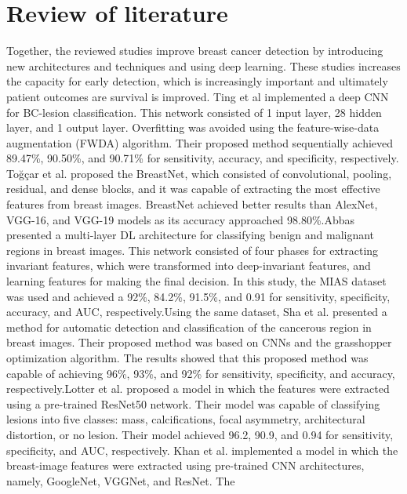 \documentclass[12]{article}
\begin{document}
\section{Review of literature}
Together, the reviewed studies improve breast cancer detection by introducing new architectures and techniques and using deep learning. These studies increases the capacity for early detection, which is increasingly important and ultimately patient outcomes are survival is improved.
\newline
Ting et al\cite{ting2019convolutional} implemented a deep CNN for BC-lesion classification. This network consisted of 1 input layer, 28 hidden layer, and 1 output layer. Overfitting was avoided using the feature-wise-data augmentation (FWDA) algorithm. Their proposed method sequentially achieved 89.47\%, 90.50\%,
and 90.71\% for sensitivity, accuracy, and specificity, respectively. Toğçar et al.\cite{tougaccar2020breastnet}  proposed the BreastNet, which consisted of convolutional, pooling, residual, and dense blocks,
and it was capable of extracting the most effective features
from breast images. BreastNet achieved better results than
AlexNet, VGG-16, and VGG-19 models as its accuracy
approached 98.80\%.Abbas \cite{abbas2016deepcad} presented a multi-layer DL architecture for classifying benign and malignant regions in
breast images. This network consisted of four phases for
extracting invariant features, which were transformed into
deep-invariant features, and learning features for making
the final decision. In this study, the MIAS dataset was used and
achieved a 92\%, 84.2\%, 91.5\%, and 0.91 for sensitivity,
specificity, accuracy, and AUC, respectively.Using the same
dataset, Sha et al.\cite{8} presented a method for automatic
detection and classification of the cancerous region in breast
images. Their proposed method was based on CNNs and the
grasshopper optimization algorithm. The results showed that
this proposed method was capable of achieving 96\%, 93\%,
and 92\% for sensitivity, specificity, and accuracy, respectively.Lotter et al. \cite{lotter2021robust}
proposed a model in which the features were extracted using
a pre-trained ResNet50 network. Their model was capable
of classifying lesions into five classes: mass, calcifications,
focal asymmetry, architectural distortion, or no lesion. Their
model achieved 96.2, 90.9, and 0.94 for sensitivity, specificity, and AUC, respectively. Khan et al.\cite{khan2019novel} implemented a model in which the
breast-image features were extracted using pre-trained CNN
architectures, namely, GoogleNet, VGGNet, and ResNet. The
\end{document}
